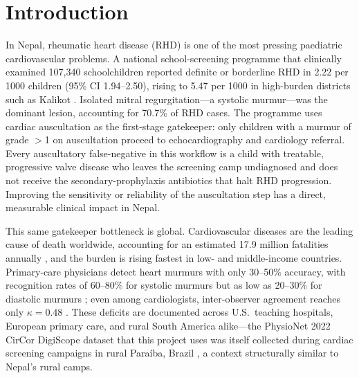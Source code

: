 \documentclass[10pt,twocolumn]{article}
\begin{document}
\begin{abstract}
cardiac-screening augmentation and contextualised with a Nepal case study on rheumatic heart disease screening where auscultation is the field-standard gatekeeper and a measurable source of missed disease \citep{nepal_rhd2023}.
\end{abstract}

\section{Introduction}

In Nepal, rheumatic heart disease (RHD) is one of the most pressing paediatric cardiovascular problems. A national school-screening programme that clinically examined 107,340 schoolchildren reported definite or borderline RHD in 2.22 per 1000 children (95\% CI 1.94--2.50), rising to 5.47 per 1000 in high-burden districts such as Kalikot \citep{nepal_rhd2023}. Isolated mitral regurgitation---a systolic murmur---was the dominant lesion, accounting for 70.7\% of RHD cases. The programme uses cardiac auscultation as the first-stage gatekeeper: only children with a murmur of grade $>$1 on auscultation proceed to echocardiography and cardiology referral. Every auscultatory false-negative in this workflow is a child with treatable, progressive valve disease who leaves the screening camp undiagnosed and does not receive the secondary-prophylaxis antibiotics that halt RHD progression. Improving the sensitivity or reliability of the auscultation step has a direct, measurable clinical impact in Nepal.

This same gatekeeper bottleneck is global. Cardiovascular diseases are the leading cause of death worldwide, accounting for an estimated 17.9 million fatalities annually \citep{who2021}, and the burden is rising fastest in low- and middle-income countries. Primary-care physicians detect heart murmurs with only 30--50\% accuracy, with recognition rates of 60--80\% for systolic murmurs but as low as 20--30\% for diastolic murmurs \citep{lam2015}; even among cardiologists, inter-observer agreement reaches only $\kappa = 0.48$ \citep{dahl2022}. These deficits are documented across U.S.\ teaching hospitals, European primary care, and rural South America alike---the PhysioNet 2022 CirCor DigiScope dataset that this project uses was itself collected during cardiac screening campaigns in rural Paraíba, Brazil \citep{challenge2022}, a context structurally similar to Nepal's rural camps.
\end{document}
